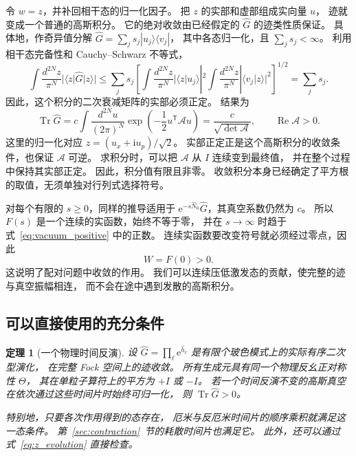 \documentclass[UTF8,11pt,a4paper,fontset=fandol]{ctexart}
\newcommand{\Tr}{\operatorname{Tr}}
\newcommand{\ee}{\mathrm e}
\newcommand{\ii}{\mathrm i}
\newcommand{\trans}{\mathsf T}
\newtheorem{theorem}{定理}
\numberwithin{equation}{section}
\begin{document}
令 $w=z$，并补回相干态的归一化因子。
把 $z$ 的实部和虚部组成实向量 $u$，
迹就变成一个普通的高斯积分。
它的绝对收敛由已经假定的 $\hat G$ 的迹类性质保证。
具体地，作奇异值分解
$\hat G=\sum_j s_j|u_j\rangle\langle v_j|$，
其中各态归一化，且 $\sum_j s_j<\infty$。
利用相干态完备性和 Cauchy--Schwarz 不等式，
\begin{equation}
 \int\frac{d^{2N}z}{\pi^N}|\langle z|\hat G|z\rangle|
 \leq\sum_j s_j
 \left[\int\frac{d^{2N}z}{\pi^N}|\langle z|u_j\rangle|^2
       \int\frac{d^{2N}z}{\pi^N}|\langle v_j|z\rangle|^2\right]^{1/2}
 =\sum_j s_j.
 \label{eq:coherent_absolute}
\end{equation}
因此，这个积分的二次衰减矩阵的实部必须正定。
结果为
\begin{equation}
 \Tr\hat G
 =c\int\frac{d^{2N}u}{(2\pi)^N}
       \exp\!\left(-\frac12u^\trans\mathcal A u\right)
 =\frac{c}{\sqrt{\det\mathcal A}},
 \qquad \operatorname{Re}\mathcal A>0.
 \label{eq:gaussian_integral}
\end{equation}
这里的归一化对应 $z=(u_x+\ii u_p)/\sqrt2$。
实部正定正是这个高斯积分的收敛条件，也保证 $\mathcal A$ 可逆。
求积分时，可以把 $\mathcal A$ 从 $I$ 连续变到最终值，
并在整个过程中保持其实部正定。
因此，积分值有限且非零。
收敛积分本身已经确定了平方根的取值，无须单独对行列式选择符号。

对每个有限的 $s\geq0$，同样的推导适用于
$\ee^{-s\hat N_0}\hat G$，其真空系数仍然为 $c$。
所以 $F(s)$ 是一个连续的实函数，始终不等于零，
并在 $s\to\infty$ 时趋于式~\eqref{eq:vacuum_positive} 中的正数。
连续实函数要改变符号就必须经过零点，因此
\begin{equation}
 \boxed{W=F(0)>0.}
 \label{eq:main_positive}
\end{equation}
这说明了配对问题中收敛的作用。
我们可以连续压低激发态的贡献，使完整的迹与真空振幅相连，
而不会在途中遇到发散的高斯积分。

\subsection{可以直接使用的充分条件}

\begin{theorem}[一个物理时间反演]
\label{thm:one_trs}
设 $\hat G=\prod_\ell\ee^{\hat h_\ell}$
是有限个玻色模式上的实际有序二次型演化，
在完整 Fock 空间上的迹收敛。
所有生成元具有同一个物理反幺正对称性 $\Theta$，
其在单粒子算符上的平方为 $+I$ 或 $-I$。
若一个时间反演不变的高斯真空在依次通过这些时间片时始终可归一化，
则 $\Tr\hat G>0$。

特别地，只要各次作用得到的态存在，
厄米与反厄米时间片的顺序乘积就满足这一态条件。
第~\ref{sec:contraction}~节的耗散时间片也满足它。
此外，还可以通过式~\eqref{eq:z_evolution} 直接检查。
\end{theorem}
\end{document}
